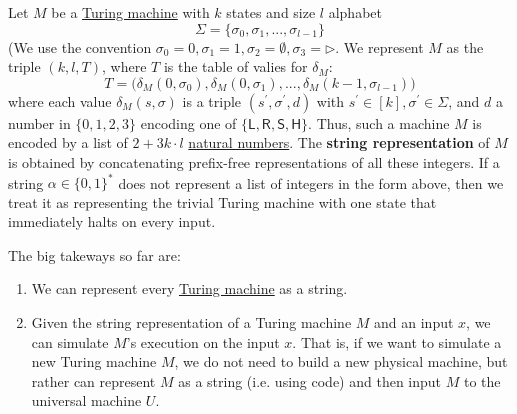   \begin{definition}
    \label{def:string-representation-of-turing-machine}
  Let $M$ be a \hyperref[def:turing-machine]{Turing machine} with $k$ states and size $l$ alphabet
  \begin{equation}
    \Sigma = \{\sigma_0, \sigma_1, ..., \sigma_{l-1}\}
  \end{equation}
  (We use the convention $\sigma_0 = 0, \sigma_1 = 1, \sigma_2 = \emptyset, \sigma_3 = \triangleright$. We represent $M$ as the triple $(k, l, T)$, where $T$ is the table of valies for $\delta_M$: 
  \begin{equation}
    T = \big(\delta_M (0, \sigma_0), \delta_M (0, \sigma_1), ..., \delta_M (k-1, \sigma_{l-1})\big)
  \end{equation}
  where each value $\delta_M (s, \sigma)$ is a triple $(s^\prime, \sigma^\prime, d)$ with $s^\prime \in [k], \sigma^\prime \in \Sigma$, and $d$ a number in $\{0,1,2,3\}$ encoding one of $\{\mathsf{L, R, S, H}\}$. Thus, such a machine $M$ is encoded by a list of $2 + 3k \cdot l$ \hyperref[st-def:naturals]{natural numbers}. The \textbf{string representation} of $M$ is obtained by concatenating prefix-free representations of all these integers. If a string $\alpha \in \{0,1\}^*$ does not represent a list of integers in the form above, then we treat it as representing the trivial Turing machine with one state that immediately halts on every input. 
  \end{definition}
  The big takeways so far are: 
  \begin{enumerate}
      \item We can represent every \hyperref[def:turing-machine]{Turing machine} as a string. 
      \item Given the string representation of a Turing machine $M$ and an input $x$, we can simulate $M$'s execution on the input $x$. That is, if we want to simulate a new Turing machine $M$, we do not need to build a new physical machine, but rather can represent $M$ as a string (i.e. using code) and then input $M$ to the universal machine $U$. 
  \end{enumerate}


